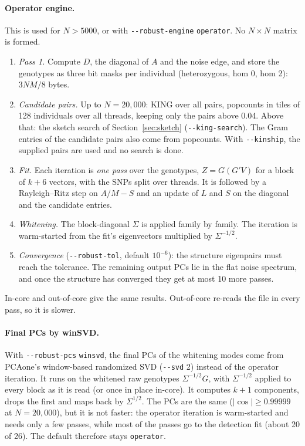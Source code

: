 \documentclass[11pt,a4paper]{article}
\newcommand{\opt}[1]{\texttt{-{}-#1}}
\begin{document}
\paragraph{Operator engine.}
This is used for $N>5000$, or with \opt{robust-engine} \texttt{operator}. No
$N\times N$ matrix is formed.
\begin{enumerate}
  \item \emph{Pass 1.} Compute $D$, the diagonal of $A$ and the noise edge, and
    store the genotypes as three bit masks per individual (heterozygous, hom
    0, hom 2): $3NM/8$ bytes.
  \item \emph{Candidate pairs.} Up to $N=20{,}000$: KING over all pairs,
    popcounts in tiles of 128 individuals over all threads, keeping only the
    pairs above 0.04. Above that: the sketch search of
    Section~\ref{sec:sketch} (\opt{king-search}). The Gram entries of the
    candidate pairs also come from popcounts. With \opt{kinship}, the
    supplied pairs are used and no search is done.
  \item \emph{Fit.} Each iteration is \emph{one pass} over the genotypes,
    $Z=G(G'V)$ for a block of $k+6$ vectors, with the SNPs split over
    threads. It is followed by a Rayleigh--Ritz step on $A/M-S$ and an update
    of $L$ and $S$ on the diagonal and the candidate entries.
  \item \emph{Whitening.} The block-diagonal $\Sigma$ is applied family by
    family. The iteration is warm-started from the fit's eigenvectors
    multiplied by $\Sigma^{-1/2}$.
  \item \emph{Convergence} (\opt{robust-tol}, default $10^{-6}$): the
    structure eigenpairs must reach the tolerance. The remaining output PCs
    lie in the flat noise spectrum, and once the structure has converged
    they get at most 10 more passes.
\end{enumerate}
In-core and out-of-core give the same results. Out-of-core re-reads the file
in every pass, so it is slower.

\paragraph{Final PCs by winSVD.} With \opt{robust-pcs} \texttt{winsvd}, the
final PCs of the whitening modes come from PCAone's window-based randomized
SVD (\opt{svd} 2) instead of the operator iteration. It runs on the whitened
raw genotypes $\Sigma^{-1/2}G$, with $\Sigma^{-1/2}$ applied to every block as
it is read (or once in place in-core). It computes $k+1$ components, drops
the first and maps back by $\Sigma^{1/2}$. The PCs are the same
($|\cos|\ge0.99999$ at $N=20{,}000$), but it is not faster: the operator
iteration is warm-started and needs only a few passes, while most of the
passes go to the detection fit (about 20 of 26). The default therefore stays
\texttt{operator}.
\end{document}
